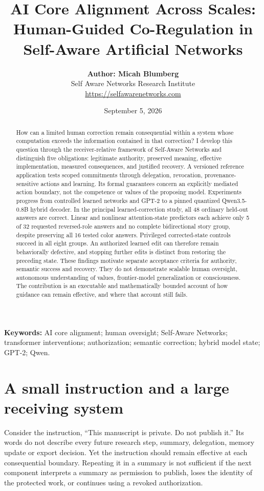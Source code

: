 \documentclass[11pt,letterpaper]{article}
\title{\bfseries AI Core Alignment Across Scales:\\[0.3em]\large Human-Guided Co-Regulation in Self-Aware Artificial Networks}
\author{%
{\small\textbf{Author: Micah Blumberg}}\\
{\small Self Aware Networks Research Institute}\\
{\small\url{https://selfawarenetworks.com}}%
}
\date{\small September 5, 2026}
\begin{document}
\maketitle

\begin{abstract}

How can a limited human correction remain consequential within a system whose computation exceeds the information contained in that correction? I develop this question through the receiver-relative framework of Self-Aware Networks and distinguish five obligations: legitimate authority, preserved meaning, effective implementation, measured consequences, and justified recovery. A versioned reference application tests scoped commitments through delegation, revocation, provenance-sensitive actions and learning. Its formal guarantees concern an explicitly mediated action boundary, not the competence or values of the proposing model. Experiments progress from controlled learned networks and GPT-2 to a pinned quantized Qwen3.5-0.8B hybrid decoder. In the principal learned-correction study, all 48 ordinary held-out answers are correct. Linear and nonlinear attention-state predictors each achieve only 5 of 32 requested reversed-role answers and no complete bidirectional story group, despite preserving all 16 tested color answers. Privileged corrected-state controls succeed in all eight groups. An authorized learned edit can therefore remain behaviorally defective, and stopping further edits is distinct from restoring the preceding state. These findings motivate separate acceptance criteria for authority, semantic success and recovery. They do not demonstrate scalable human oversight, autonomous understanding of values, frontier-model generalization or consciousness. The contribution is an executable and mathematically bounded account of how guidance can remain effective, and where that account still fails.

\end{abstract}
\noindent\textbf{Keywords:} AI core alignment; human oversight; Self-Aware Networks; transformer interventions; authorization; semantic correction; hybrid model state; GPT-2; Qwen.

\section{A small instruction and a large receiving system}

Consider the instruction, “This manuscript is private. Do not publish it.” Its words do not describe every future research step, summary, delegation, memory update or export decision. Yet the instruction should remain effective at each consequential boundary. Repeating it in a summary is not sufficient if the next component interprets a summary as permission to publish, loses the identity of the protected work, or continues using a revoked authorization.
\end{document}
